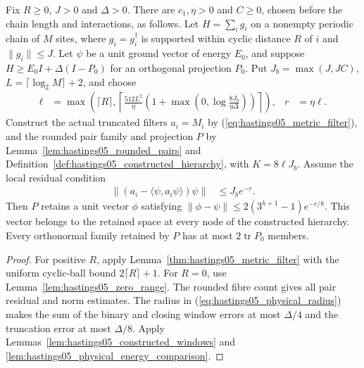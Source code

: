 \begin{lemma}
    \label{thm:hastings05_physical_hierarchy}
    \leanok
    Fix $R\ge0$, $J>0$ and $\Delta>0$. There are $c_1,\eta>0$ and
    $C\ge0$, chosen before the chain length and interactions, as follows.
    Let $H=\sum_i g_i$ on a nonempty periodic chain of $M$ sites, where
    $g_i=g_i^\dagger$ is supported within cyclic distance $R$ of $i$
    and $\|g_i\|\le J$. Let $\psi$ be a unit ground vector of energy
    $E_0$, and suppose $H\ge E_0I+\Delta(I-P_0)$ for an orthogonal
    projection $P_0$. Put $J_b=\max(J,JC)$, $L=\lceil\log_2M\rceil+2$,
    and choose
    \begin{align}
        \ell&=\max\left(\lceil R\rceil,
          \left\lceil\frac{512L^2}{\eta}
          \left(1+\max\left(0,\log\frac{8J_b}{\eta\Delta}\right)\right)
          \right\rceil\right),&r&=\eta\ell.
        \label{eq:hastings05_physical_radius}
    \end{align}
    Construct the actual truncated filters $a_i=M_i$ by
    (\ref{eq:hastings05_metric_filter}), and the rounded pair family
    and projection $P$ by Lemma~\ref{lem:hastings05_rounded_pairs} and
    Definition~\ref{def:hastings05_constructed_hierarchy}, with
    $K=8\ell J_b$. Assume the local residual condition
    \begin{align}
        \|(a_i-\langle\psi,a_i\psi\rangle)\psi\|
           &\le J_b e^{-r}.
        \label{eq:hastings05_physical_low}
    \end{align}
    Then $P$ retains a unit vector $\phi$ satisfying
    $\|\phi-\psi\|\le2(3^{h+1}-1)e^{-r/8}$. This vector belongs to
    the retained space at every node of the constructed hierarchy.
    Every orthonormal family retained by $P$ has at most
    $2\operatorname{tr}P_0$ members.
\end{lemma}
\begin{proof}\leanok
    For positive $R$, apply Lemma~\ref{thm:hastings05_metric_filter}
    with the uniform cyclic-ball bound $2\lceil R\rceil+1$. For $R=0$,
    use Lemma~\ref{lem:hastings05_zero_range}. The rounded fibre count
    gives all pair residual and norm estimates. The radius in
    (\ref{eq:hastings05_physical_radius}) makes the sum of the binary
    and closing window errors at most $\Delta/4$ and the truncation
    error at most $\Delta/8$. Apply
    Lemmas~\ref{lem:hastings05_constructed_windows} and
    \ref{lem:hastings05_physical_energy_comparison}.
\end{proof}

